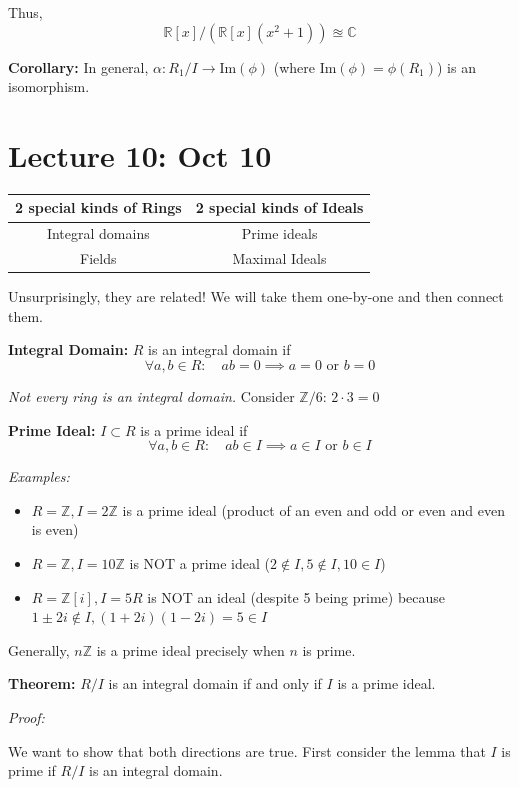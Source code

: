 \documentclass[12pt]{report}
\newcommand{\R}{\mathbb{R}}
\newcommand{\Z}{\mathbb{Z}}
\begin{document}
Thus, 
\[\R[x]/(\R[x](x^2+1)) \approxeq \mathbb{C}\]

\textbf{Corollary:} In general, $\alpha: R_1/I \to \text{Im}(\phi)$ (where $\text{Im}(\phi) = \phi(R_1)$) is an isomorphism. 

\section*{Lecture 10: Oct 10}
\begin{center}
    \begin{tabular}{|c|c|}
        \hline 
        2 special kinds of Rings & 2 special kinds of Ideals\\ 
        \hline
        Integral domains & Prime ideals\\ 
        Fields & Maximal Ideals\\
        \hline
    \end{tabular}
\end{center}
Unsurprisingly, they are related! We will take them one-by-one and then connect them. 

\textbf{Integral Domain:} $R$ is an integral domain if  
\[\forall a, b \in R: \quad ab = 0 \implies a = 0 \text{ or } b = 0\]

\emph{Not every ring is an integral domain.} Consider $\Z/6$: $2 \cdot 3 = 0$

\textbf{Prime Ideal:} $I \subset R$ is a prime ideal if 
\[\forall a, b \in R: \quad ab \in I \implies a\in I \text{ or } b \in I\]

\emph{Examples:}
\begin{itemize}
    \item $R = \Z, I = 2\Z$ is a prime ideal (product of an even and odd or even and even is even)
    \item $R = \Z, I = 10\Z$ is NOT a prime ideal ($2 \not \in I, 5 \not \in I, 10 \in I$)
    \item $R = \Z[i], I = 5R$ is NOT an ideal (despite 5 being prime) because $1 \pm 2i \not \in I, (1 + 2i)(1-2i) = 5 \in I$
\end{itemize}

Generally, $n\Z$ is a prime ideal precisely when $n$ is prime. 
\vspace*{0.25in}

\textbf{Theorem:} $R/I$ is an integral domain if and only if $I$ is a prime ideal. 

\emph{Proof:} 

We want to show that both directions are true. First consider the lemma that $I$ is prime if $R/I$ is an integral domain. 
\end{document}
